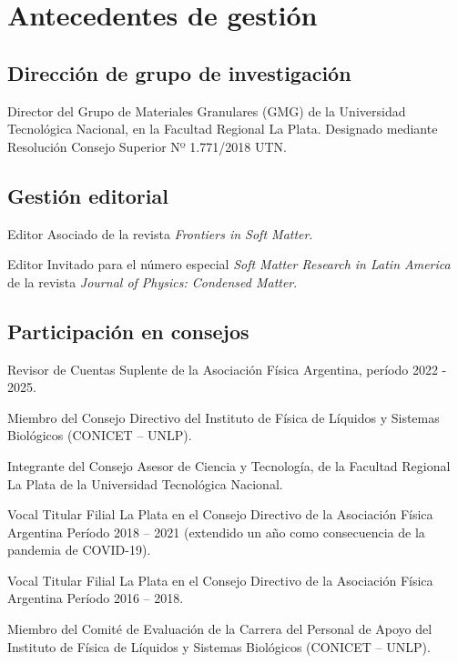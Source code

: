 \section{Antecedentes de gestión}

\subsection{Dirección de grupo de investigación}
 Director del Grupo de Materiales Granulares (GMG) de la Universidad Tecnológica Nacional, en la Facultad Regional La Plata. Designado mediante Resolución Consejo Superior Nº 1.771/2018 UTN.

\subsection{Gestión editorial}

 Editor Asociado de la revista \textit{Frontiers in Soft Matter}.

 Editor Invitado para el número especial \textit{Soft Matter Research in Latin America} de la revista \textit{Journal of Physics: Condensed Matter}.

\subsection{Participación en consejos }
 Revisor de Cuentas Suplente de la Asociación Física Argentina, período 2022 - 2025. 

 Miembro del Consejo Directivo del Instituto de Física de Líquidos y Sistemas Biológicos (CONICET -- UNLP).


  Integrante del Consejo Asesor de Ciencia y Tecnología, de la Facultad Regional La Plata de la Universidad Tecnológica Nacional.
 
  Vocal Titular Filial La Plata en el Consejo Directivo de la Asociación Física Argentina Período 2018 -- 2021 (extendido un año como consecuencia de la pandemia de COVID-19).

   Vocal Titular Filial La Plata en el Consejo Directivo de la Asociación Física Argentina Período 2016 -- 2018.

   Miembro del Comité de Evaluación de la Carrera del Personal de Apoyo del Instituto de Física de Líquidos y Sistemas Biológicos (CONICET -- UNLP).
  
  
